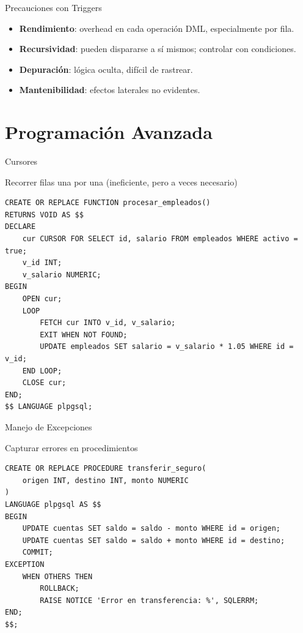 \documentclass[aspectratio=169, 10pt, xcolor=table]{beamer}
\begin{document}
\begin{frame}{Precauciones con Triggers}
    \begin{itemize}
        \item \textbf{Rendimiento}: overhead en cada operación DML, especialmente por fila.
        \item \textbf{Recursividad}: pueden dispararse a sí mismos; controlar con condiciones.
        \item \textbf{Depuración}: lógica oculta, difícil de rastrear.
        \item \textbf{Mantenibilidad}: efectos laterales no evidentes.
    \end{itemize}
\end{frame}

\section{Programación Avanzada}

\begin{frame}[fragile]{Cursores}
    \begin{block}{Recorrer filas una por una (ineficiente, pero a veces necesario)}
        \begin{lstlisting}
CREATE OR REPLACE FUNCTION procesar_empleados()
RETURNS VOID AS $$
DECLARE
    cur CURSOR FOR SELECT id, salario FROM empleados WHERE activo = true;
    v_id INT;
    v_salario NUMERIC;
BEGIN
    OPEN cur;
    LOOP
        FETCH cur INTO v_id, v_salario;
        EXIT WHEN NOT FOUND;
        UPDATE empleados SET salario = v_salario * 1.05 WHERE id = v_id;
    END LOOP;
    CLOSE cur;
END;
$$ LANGUAGE plpgsql;
        \end{lstlisting}
    \end{block}
\end{frame}

\begin{frame}[fragile]{Manejo de Excepciones}
    \begin{block}{Capturar errores en procedimientos}
        \begin{lstlisting}
CREATE OR REPLACE PROCEDURE transferir_seguro(
    origen INT, destino INT, monto NUMERIC
)
LANGUAGE plpgsql AS $$
BEGIN
    UPDATE cuentas SET saldo = saldo - monto WHERE id = origen;
    UPDATE cuentas SET saldo = saldo + monto WHERE id = destino;
    COMMIT;
EXCEPTION
    WHEN OTHERS THEN
        ROLLBACK;
        RAISE NOTICE 'Error en transferencia: %', SQLERRM;
END;
$$;
        \end{lstlisting}
    \end{block}
\end{frame}
\end{document}
